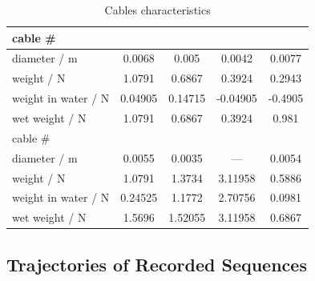 \begin{table}
	\centering
	\robustify\bfseries
	\caption{Cables characteristics}
	\begin{tabular}{@{}l|SSSS@{}}
		\toprule
		cable \#                    &  &  &  &  \\ \midrule
		diameter / \unit{\m}        & 0.0068                      & 0.005                          & 0.0042                        & 0.0077                       \\
		weight / \unit{\N}          & 1.0791                      & 0.6867                         & 0.3924                        & 0.2943                       \\
		weight in water / \unit{\N} & 0.04905                     & 0.14715                        & -0.04905                      & -0.4905                      \\
		wet weight / \unit{\N}      & 1.0791                      & 0.6867                         & 0.3924                        & 0.981                        \\ \midrule[1pt]
		cable \#                    &     &    &      &   \\ \midrule
		diameter / \unit{\m}        & 0.0055                      & 0.0035                         & {---}                         & 0.0054                       \\
		weight / \unit{\N}          & 1.0791                      & 1.3734                         & 3.11958                       & 0.5886                       \\
		weight in water / \unit{\N} & 0.24525                     & 1.1772                         & 2.70756                       & 0.0981                       \\
		wet weight / \unit{\N}      & 1.5696                      & 1.52055                        & 3.11958                       & 0.6867                       \\ \bottomrule
	\end{tabular}
	\label{e_acmev_es_cables_characteristics}
\end{table}

\subsection{Trajectories of Recorded Sequences}
\label{e_acmev_trajectories_of_recorded_sequences}

